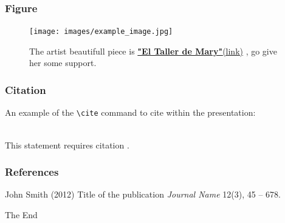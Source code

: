 \documentclass[14.5pt]{beamer}
\begin{document}

\begin{frame}
\frametitle{Figure}
\begin{figure}
\texttt{[image: images/example\_image.jpg]}
\caption{The artist beautifull piece is \href{https://www.facebook.com/El-Taller-de-Mary-467073823467562}{\textbf{"El Taller de Mary"}(link)} , go give her some support.}
\end{figure}
\end{frame}


\begin{frame}[fragile] %
\frametitle{Citation}
An example of the \verb|\cite| command to cite within the presentation:\\~

This statement requires citation \cite{p1}.
\end{frame}


\begin{frame}
\frametitle{References}
\footnotesize{
\begin{thebibliography}{99} %
 John Smith (2012)
\newblock Title of the publication
\newblock \emph{Journal Name} 12(3), 45 -- 678.
\end{thebibliography}
}
\end{frame}


\begin{frame}
\Huge{\centerline{The End}}
\end{frame}

\end{document}
